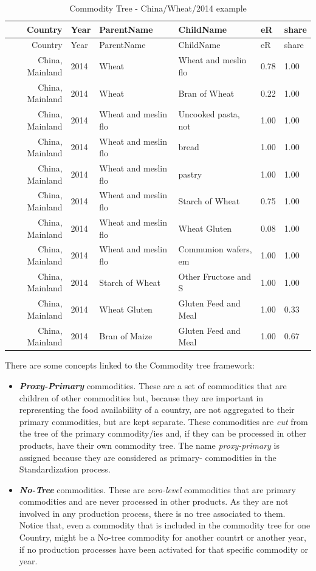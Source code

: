 \documentclass[]{article}
\providecommand{\tightlist}{%
  \setlength{\itemsep}{0pt}\setlength{\parskip}{0pt}}
\begin{document}
\begin{longtable}[]{@{}rlllll@{}}
\caption{Commodity Tree - China/Wheat/2014 example}\tabularnewline
\toprule
Country & Year & ParentName & ChildName & eR & share\tabularnewline
\midrule
\endfirsthead
\toprule
Country & Year & ParentName & ChildName & eR & share\tabularnewline
\midrule
\endhead
China, Mainland & 2014 & Wheat & Wheat and meslin flo & 0.78 &
1.00\tabularnewline
China, Mainland & 2014 & Wheat & Bran of Wheat & 0.22 &
1.00\tabularnewline
China, Mainland & 2014 & Wheat and meslin flo & Uncooked pasta, not &
1.00 & 1.00\tabularnewline
China, Mainland & 2014 & Wheat and meslin flo & bread & 1.00 &
1.00\tabularnewline
China, Mainland & 2014 & Wheat and meslin flo & pastry & 1.00 &
1.00\tabularnewline
China, Mainland & 2014 & Wheat and meslin flo & Starch of Wheat & 0.75 &
1.00\tabularnewline
China, Mainland & 2014 & Wheat and meslin flo & Wheat Gluten & 0.08 &
1.00\tabularnewline
China, Mainland & 2014 & Wheat and meslin flo & Communion wafers, em &
1.00 & 1.00\tabularnewline
China, Mainland & 2014 & Starch of Wheat & Other Fructose and S & 1.00 &
1.00\tabularnewline
China, Mainland & 2014 & Wheat Gluten & Gluten Feed and Meal & 1.00 &
0.33\tabularnewline
China, Mainland & 2014 & Bran of Maize & Gluten Feed and Meal & 1.00 &
0.67\tabularnewline
\bottomrule
\end{longtable}

There are some concepts linked to the Commodity tree framework:

\begin{itemize}
\tightlist
\item
  \textbf{\emph{Proxy-Primary}} commodities. These are a set of
  commodities that are children of other commodities but, because they
  are important in representing the food availability of a country, are
  not aggregated to their primary commodities, but are kept separate.
  These commodities are \emph{cut} from the tree of the primary
  commodity/ies and, if they can be processed in other products, have
  their own commodity tree. The name \emph{proxy-primary} is assigned
  because they are considered as primary- commodities in the
  Standardization process.
\item
  \textbf{\emph{No-Tree}} commodities. These are \emph{zero-level}
  commodities that are primary commodities and are never processed in
  other products. As they are not involved in any production process,
  there is no tree associated to them. Notice that, even a commodity
  that is included in the commodity tree for one Country, might be a
  No-tree commodity for another countrt or another year, if no
  production processes have been activated for that specific commodity
  or year.
\end{itemize}
\end{document}
